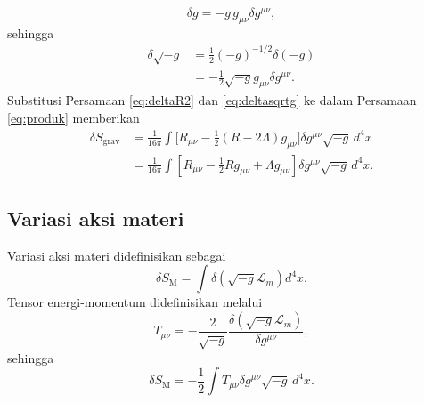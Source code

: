 \begin{equation} \delta g = -g\,g_{\mu\nu} \delta g^{\mu\nu}, \end{equation}
sehingga
\begin{align} \delta\sqrt{-g} &= \frac{1}{2} (-g)^{-1/2} \delta(-g) \nonumber\\ &= -\frac{1}{2} \sqrt{-g} g_{\mu\nu} \delta g^{\mu\nu}. \label{eq:deltasqrtg} \end{align}
Substitusi Persamaan \eqref{eq:deltaR2} dan \eqref{eq:deltasqrtg} ke dalam Persamaan \eqref{eq:produk} memberikan
\begin{align} \delta S_{\mathrm{grav}} &= \frac{1}{16\pi} \int \Bigg[ R_{\mu\nu} - \frac12 (R-2\Lambda) g_{\mu\nu} \Bigg] \delta g^{\mu\nu} \sqrt{-g} \,d^4x \nonumber\\ &= \frac{1}{16\pi} \int \left[ R_{\mu\nu} -\frac12Rg_{\mu\nu} +\Lambda g_{\mu\nu} \right] \delta g^{\mu\nu} \sqrt{-g} \,d^4x. \label{eq:gravakhir} \end{align}

\subsection*{Variasi aksi materi}
Variasi aksi materi didefinisikan sebagai
\begin{equation} \delta S_{\mathrm M} = \int \delta (\sqrt{-g}\mathcal L_m) d^4x. \end{equation}
Tensor energi-momentum didefinisikan melalui
\begin{equation} T_{\mu\nu} = -\frac{2}{\sqrt{-g}} \frac{\delta (\sqrt{-g}\mathcal L_m)} {\delta g^{\mu\nu}}, \end{equation}
sehingga
\begin{equation} \delta S_{\mathrm M} = -\frac12 \int T_{\mu\nu} \delta g^{\mu\nu} \sqrt{-g} \,d^4x. \label{eq:materiakhir} \end{equation}

